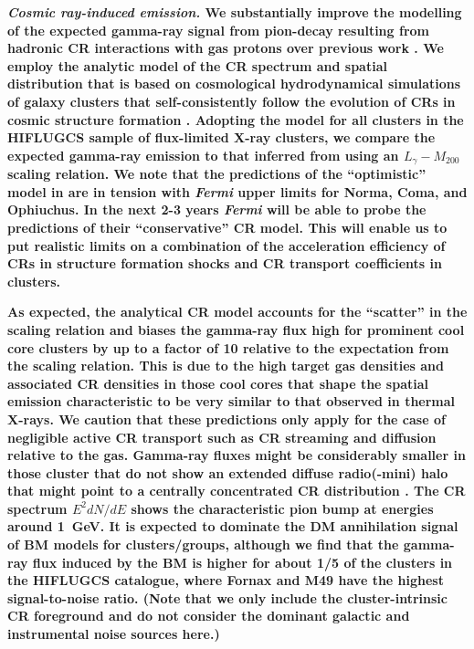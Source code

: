 \documentclass[10pt,aps,pra,reprint,amsmath,amsfonts,amssymb,showpacs,nofootinbib,floatfix]{revtex4-1}
\def\del#1{{}}
\def\C#1{{\bf #1}}
\newcommand{\Fermi}{{\em Fermi}\xspace}
\newcommand{\mvir}{M_{200}}
\begin{document}
{\C{{\em Cosmic ray-induced emission.} We substantially improve the
  modelling of the expected gamma-ray signal from pion-decay resulting
  from hadronic CR interactions with gas protons over previous work
  \cite{2010ApJ...717L..71A}. We employ the analytic model of the CR
  spectrum and spatial distribution that is based on cosmological
  hydrodynamical simulations of galaxy clusters that self-consistently
  follow the evolution of CRs in cosmic structure formation
  \cite{2010MNRAS.409..449P}. Adopting the model for all clusters in
  the HIFLUGCS sample of flux-limited X-ray clusters, we compare the
  expected gamma-ray emission to that inferred from using an
  $L_\gamma-\mvir$ scaling relation. We note that the predictions of
  the ``optimistic'' model in \cite{2010MNRAS.409..449P} are in
  tension with \Fermi upper limits for Norma, Coma, and Ophiuchus. In
  the next 2-3 years \Fermi will be able to probe the predictions of
  their ``conservative'' CR model. This will enable us to put
  realistic limits on a combination of the acceleration efficiency of
  CRs in structure formation shocks and CR transport coefficients in
  clusters.}

\C{As expected, the analytical CR model accounts for the ``scatter''
  in the scaling relation and biases the gamma-ray flux high for
  prominent cool core clusters by up to a factor of 10 relative to the
  expectation from the scaling relation. This is due to the high
  target gas densities and associated CR densities in those cool cores
  that shape the spatial emission characteristic to be very similar to
  that observed in thermal X-rays. We caution that these predictions
  only apply for the case of negligible active CR transport such as CR
  streaming and diffusion relative to the gas. Gamma-ray fluxes might
  be considerably smaller in those cluster that do not show an
  extended diffuse radio(-mini) halo that might point to a centrally
  concentrated CR distribution \cite{2011A&A...527A..99E}. The CR
  spectrum $E^2 dN/dE$ shows the characteristic pion bump at energies
  around 1~GeV. It is expected to dominate the DM annihilation signal
  of BM models for clusters/groups, although we find that the
  gamma-ray flux induced by the BM is higher for about 1/5 of the
  clusters in the HIFLUGCS catalogue, where Fornax and M49 have the
  highest signal-to-noise ratio. (Note that we only include the
  cluster-intrinsic CR foreground and do not consider the dominant
  galactic and instrumental noise sources here.)}

\del{ We find that
  \Fermi-LAT will be able to start constraining these DM models within
  five years using clusters of galaxies.}

}
\end{document}
